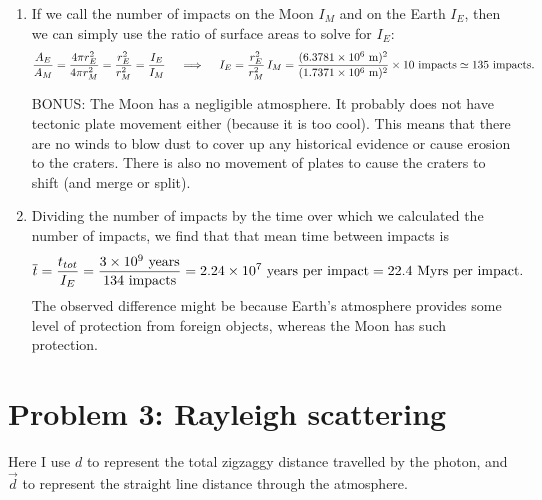 \documentclass[11pt,letterpaper]{article}
\begin{document}
\begin{enumerate}[label=(\alph*)]
    \item If we call the number of impacts on the Moon $I_M$ and on the Earth $I_E$, then we can simply use the ratio of surface areas to solve for $I_E$:
        \begin{equation*}
            \frac{A_E}{A_M} = \frac{4\pi r_E^2}{4\pi r_M^2} = \frac{r_E^2}{r_M^2} = \frac{I_E}{I_M} \\\quad
            \implies \quad I_E = \frac{r_E^2}{r_M^2}\,I_M = \frac{(6.3781\times 10^{6}~{\rm m})^2}{(1.7371\times 10^{6}~{\rm m})^2}\times 10~{\rm impacts} \simeq 135~{\rm impacts}. 
        \end{equation*}

        BONUS: The Moon has a negligible atmosphere. It probably does not have tectonic plate movement either (because it is too cool). This means that there are no winds to blow dust to cover up any historical evidence or cause erosion to the craters. There is also no movement of plates to cause the craters to shift (and merge or split). 

    \item Dividing the number of impacts by the time over which we calculated the number of impacts, we find that that mean time between impacts is
        \begin{equation*}
            \overline{t} = \frac{t_{tot}}{I_E} = \frac{3\times 10^{9}~{\rm years}}{134~{\rm impacts}} = 2.24\times 10^{7}~\text{years per impact} = 22.4~\text{Myrs per impact}.
        \end{equation*}
        The observed difference might be because Earth's atmosphere provides some level of protection from foreign objects, whereas the Moon has such protection.
\end{enumerate}




\section*{Problem 3: Rayleigh scattering}

Here I use $d$ to represent the total zigzaggy distance travelled by the photon, and $\vec{d}$ to represent the straight line distance through the atmosphere. 
\end{document}
